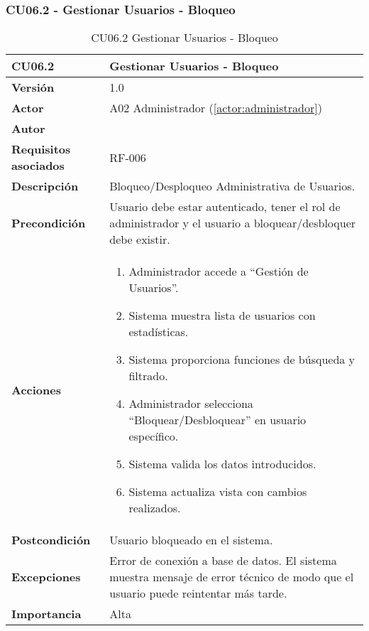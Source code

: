 \subsubsection{CU06.2 - Gestionar Usuarios - Bloqueo}

\begin{table}[H]
	\centering
	\begin{tabularx}{\linewidth}{ p{} p{} }
		\toprule
		\textbf{CU06.2}    & \textbf{Gestionar Usuarios - Bloqueo} \\
		\toprule
		\textbf{Versión}              & 1.0    \\
		\textbf{Actor}                & A02 Administrador (\ref{actor:administrador}) \\
		\textbf{Autor}                & \nombre \\
		\textbf{Requisitos asociados} & RF-006 \\
		\textbf{Descripción}          & Bloqueo/Desploqueo Administrativa de Usuarios. \\
		\textbf{Precondición}         & Usuario debe estar autenticado, tener el rol de administrador y el usuario a bloquear/desbloquer debe existir. \\
		\textbf{Acciones}             &
		\begin{enumerate}
			\def\labelenumi{\arabic{enumi}.}
			\tightlist
			\item Administrador accede a ``Gestión de Usuarios''.
            \item Sistema muestra lista de usuarios con estadísticas.
            \item Sistema proporciona funciones de búsqueda y filtrado.
            \item Administrador selecciona ``Bloquear/Desbloquear'' en usuario específico.
            \item Sistema valida los datos introducidos.
            \item Sistema actualiza vista con cambios realizados.
		\end{enumerate}\\
		\textbf{Postcondición}        & Usuario bloqueado en el sistema.\\
		\textbf{Excepciones}          & Error de conexión a base de datos. El sistema muestra mensaje de error técnico de modo que el usuario puede reintentar más tarde.\\
		\textbf{Importancia}          & Alta \\
		\bottomrule
	\end{tabularx}
	\caption{CU06.2 Gestionar Usuarios - Bloqueo}
	\label{cu:gestionar-usuarios-bloqueo}
\end{table}

